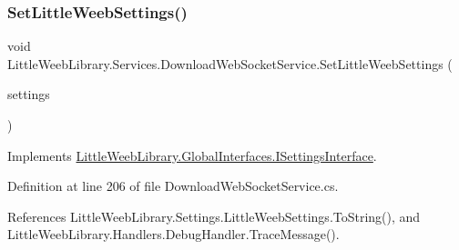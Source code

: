 \subsubsection{\texorpdfstring{Set\+Little\+Weeb\+Settings()}{SetLittleWeebSettings()}}
{\footnotesize\ttfamily void Little\+Weeb\+Library.\+Services.\+Download\+Web\+Socket\+Service.\+Set\+Little\+Weeb\+Settings (\begin{DoxyParamCaption}\item[{\mbox{\hyperlink{class_little_weeb_library_1_1_settings_1_1_little_weeb_settings}{Little\+Weeb\+Settings}}}]{settings }\end{DoxyParamCaption})}



Implements \mbox{\hyperlink{interface_little_weeb_library_1_1_global_interfaces_1_1_i_settings_interface_a5c53e44105f1f4c7f8c3e546d29939d7}{Little\+Weeb\+Library.\+Global\+Interfaces.\+I\+Settings\+Interface}}.



Definition at line 206 of file Download\+Web\+Socket\+Service.\+cs.



References Little\+Weeb\+Library.\+Settings.\+Little\+Weeb\+Settings.\+To\+String(), and Little\+Weeb\+Library.\+Handlers.\+Debug\+Handler.\+Trace\+Message().


